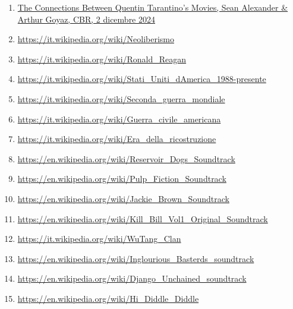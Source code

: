 \documentclass[12pt]{article} %
\begin{document}
\begin{flushleft}
\begin{enumerate}
        \item \href{https://www.cbr.com/quentin-tarantino-movie-connections-explained/}{The Connections Between Quentin Tarantino's Movies, Sean Alexander \& Arthur Goyaz, CBR, 2 dicembre 2024}
        \item \href{https://it.wikipedia.org/wiki/Neoliberismo}{https://it.wikipedia.org/wiki/Neoliberismo}
        \item \href{https://it.wikipedia.org/wiki/Ronald_Reagan}{https://it.wikipedia.org/wiki/Ronald\_Reagan}
        \item \href{https://it.wikipedia.org/wiki/Storia_degli_Stati_Uniti_d%27America_(1988-presente)}{https://it.wikipedia.org/wiki/Stati\_Uniti\_dAmerica\_1988-presente}
        \item \href{https://it.wikipedia.org/wiki/Seconda_guerra_mondiale}{https://it.wikipedia.org/wiki/Seconda\_guerra\_mondiale}
        \item \href{https://it.wikipedia.org/wiki/Guerra_civile_americana}{https://it.wikipedia.org/wiki/Guerra\_civile\_americana}
        \item \href{https://it.wikipedia.org/wiki/Era_della_ricostruzione}{https://it.wikipedia.org/wiki/Era\_della\_ricostruzione}
        \item \href{https://en.wikipedia.org/wiki/Reservoir_Dogs_(soundtrack)}{https://en.wikipedia.org/wiki/Reservoir\_Dogs\_Soundtrack}
        \item \href{https://en.wikipedia.org/wiki/Pulp_Fiction_(soundtrack)}{https://en.wikipedia.org/wiki/Pulp\_Fiction\_Soundtrack}
        \item \href{https://en.wikipedia.org/wiki/Jackie_Brown:_Music_from_the_Miramax_Motion_Picture}{https://en.wikipedia.org/wiki/Jackie\_Brown\_Soundtrack}
        \item \href{https://en.wikipedia.org/wiki/Kill_Bill_Vol._1_Original_Soundtrack}{https://en.wikipedia.org/wiki/Kill\_Bill\_Vol1\_Original\_Soundtrack}
        \item \href{https://it.wikipedia.org/wiki/Wu-Tang_Clan}{https://it.wikipedia.org/wiki/WuTang\_Clan}
        \item \href{https://en.wikipedia.org/wiki/Inglourious_Basterds_(soundtrack)}{https://en.wikipedia.org/wiki/Inglourious\_Basterds\_soundtrack}
        \item \href{https://en.wikipedia.org/wiki/Django_Unchained_(soundtrack)}{https://en.wikipedia.org/wiki/Django\_Unchained\_soundtrack}
        \item \href{https://en.wikipedia.org/wiki/Hi_Diddle_Diddle}{https://en.wikipedia.org/wiki/Hi\_Diddle\_Diddle}

\end{enumerate}
\end{flushleft}
\end{document}
